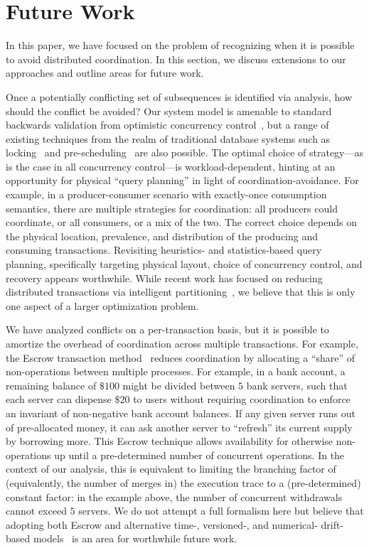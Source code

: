 
\section{Future Work}
\label{sec:discussion}

In this paper, we have focused on the problem of recognizing when it
is possible to avoid distributed coordination. In this section, we
discuss extensions to our approaches and outline areas for future
work.

 Once a potentially conflicting set of
subsequences is identified via \iconfluence analysis, how should the
conflict be avoided? Our system model is amenable to standard
backwards validation from optimistic concurrency
control~\cite{bernstein-book}, but a range of existing techniques from
the realm of traditional database systems such as
locking~\cite{gray-virtues} and pre-scheduling~\cite{calvin} are also
possible. The optimal choice of strategy---as is the case in all
concurrency control---is workload-dependent, hinting at an opportunity
for physical ``query planning'' in light of
coordination-avoidance. For example, in a producer-consumer scenario
with exactly-once consumption semantics, there are multiple strategies
for coordination: all producers could coordinate, or all consumers, or
a mix of the two. The correct choice depends on the physical location,
prevalence, and distribution of the producing and consuming
transactions. Revisiting heuristics- and statistics-based query
planning, specifically targeting physical layout, choice of
concurrency control, and recovery appears worthwhile. While recent
work has focused on reducing distributed transactions via intelligent
partitioning~\cite{schism}, we believe that this is only one aspect of
a larger optimization problem.

 We have analyzed conflicts on a
per-transaction basis, but it is possible to amortize the overhead of
coordination across multiple transactions. For example, the Escrow
transaction method~\cite{escrow} reduces coordination by allocating a
``share'' of non-\iconfluent operations between multiple
processes. For example, in a bank account, a remaining balance of
$\$100$ might be divided between $5$ bank servers, such that each
server can dispense $\$20$ to users without requiring coordination to
enforce an invariant of non-negative bank account balances. If any
given server runs out of pre-allocated money, it can ask another
server to ``refresh'' its current supply by borrowing more. This
Escrow technique allows availability for otherwise non-\iconfluent
operations up until a pre-determined number of concurrent
operations. In the context of our \cfreedom analysis, this is
equivalent to limiting the branching factor of (equivalently, the
number of merges in) the execution trace to a (pre-determined)
constant factor: in the example above, the number of concurrent
withdrawals cannot exceed $5$ servers. We do not attempt a full
formalism here but believe that adopting both Escrow and alternative
time-, versioned-, and numerical- drift-based models~\cite{yu-conit}
is an area for worthwhile future work.

